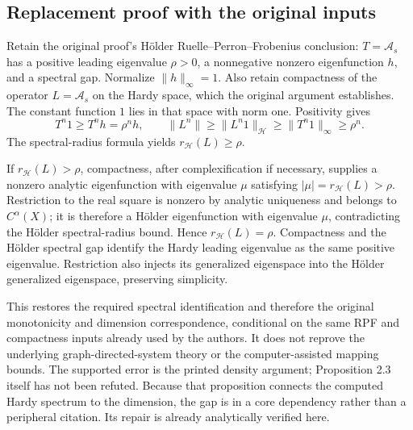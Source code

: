 \documentclass[10pt]{article}
\begin{document}
\subsection*{Replacement proof with the original inputs}
Retain the original proof’s Hölder Ruelle–Perron–Frobenius conclusion: \(T=\mathcal A_s\) has a positive leading eigenvalue \(\rho>0\), a nonnegative nonzero eigenfunction \(h\), and a spectral gap. Normalize \(\|h\|_\infty=1\). Also retain compactness of the operator \(L=\mathcal A_s\) on the Hardy space, which the original argument establishes. The constant function \(1\) lies in that space with norm one. Positivity gives \[T^n1\ge T^nh=\rho^nh,\qquad
 \|L^n\|\ge\|L^n1\|_{\mathcal H}\ge\|T^n1\|_\infty\ge\rho^n.\] The spectral-radius formula yields \(r_{\mathcal H}(L)\ge\rho\).\par
If \(r_{\mathcal H}(L)>\rho\), compactness, after complexification if necessary, supplies a nonzero analytic eigenfunction with eigenvalue \(\mu\) satisfying \(|\mu|=r_{\mathcal H}(L)>\rho\). Restriction to the real square is nonzero by analytic uniqueness and belongs to \(C^\alpha(X)\); it is therefore a Hölder eigenfunction with eigenvalue \(\mu\), contradicting the Hölder spectral-radius bound. Hence \(r_{\mathcal H}(L)=\rho\). Compactness and the Hölder spectral gap identify the Hardy leading eigenvalue as the same positive eigenvalue. Restriction also injects its generalized eigenspace into the Hölder generalized eigenspace, preserving simplicity.\par
This restores the required spectral identification and therefore the original monotonicity and dimension correspondence, conditional on the same RPF and compactness inputs already used by the authors. It does not reprove the underlying graph-directed-system theory or the computer-assisted mapping bounds. The supported error is the printed density argument; Proposition 2.3 itself has not been refuted. Because that proposition connects the computed Hardy spectrum to the dimension, the gap is in a core dependency rather than a peripheral citation. Its repair is already analytically verified here.\par
\end{document}
